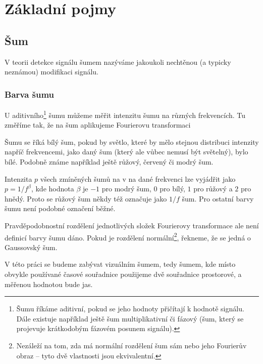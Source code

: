 \chapter{Základní pojmy}

\section{Šum}

V teorii detekce signálu šumem nazýváme jakoukoli nechtěnou (a typicky neznámou) modifikaci signálu.

\subsection{Barva šumu}

U aditivního\footnote{Šumu říkáme aditivní, pokud se jeho hodnoty přičítají k
hodnotě signálu. Dále existuje například ještě šum multiplikativní či fázový
(šum, který se projevuje krátkodobým fázovém posunem signálu).} šumu můžeme
měřit intenzitu šumu na různých frekvencích. Tu změříme tak, že na šum aplikujeme
Fourierovu transformaci

 Šumu se
říká bílý šum, pokud by světlo, které by mělo stejnou distribuci intenzity
napříč frekvencemi, jako daný šum (který ale vůbec nemusí být světelný), bylo
bílé. Podobně známe například ještě růžový, červený či modrý šum.

Intenzita $p$ všech zmíněných šumů na v na dané frekvenci lze vyjádřit jako
$p=1/f^\beta$, kde hodnota $\beta$ je $-1$ pro modrý šum, $0$ pro bílý, $1$ pro
růžový a $2$ pro hnědý. Proto se růžový šum někdy též označuje jako $1/f$ šum. Pro
ostatní barvy šumu není podobné označení běžné.

Pravděpodobnostní rozdělení jednotlivých složek Fourierovy transformace ale
není definicí barvy šumu dáno. Pokud je rozdělení normální\footnote{Nezáleží na
tom, zda má normální rozdělení šum sám nebo jeho Fourierův obraz -- tyto dvě
vlastnosti jsou ekvivalentní.}, řekneme, že se jedná o Gaussovský šum.  

V této práci se budeme zabývat vizuálním šumem, tedy šumem, kde místo obvykle
používané časové souřadnice použijeme dvě souřadnice prostorové, a měřenou
hodnotou bude jas. 

